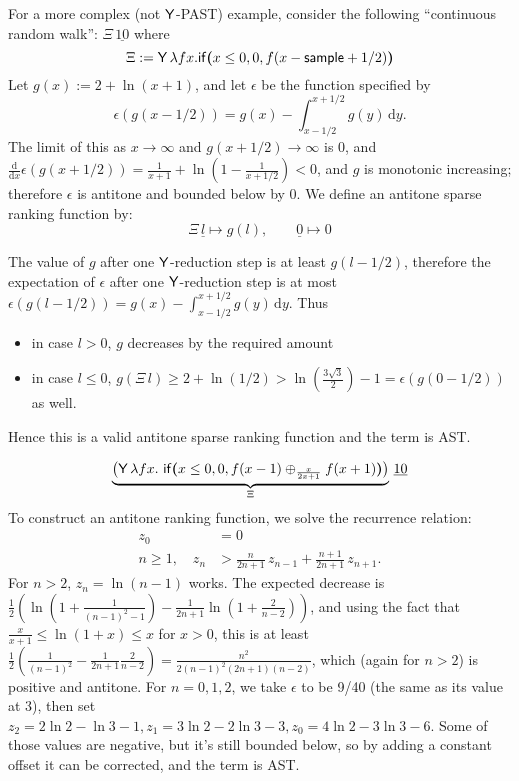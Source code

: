 For a more complex (not $\mathsf{Y}$-PAST) example, consider the following ``continuous random walk'': $\Xi \, \underline{10}$ where
\[
\Xi := \mathsf{Y} \, \lambda f x . \mathsf{if}\boldsymbol{(}x \leq 0, 0, f(x - \mathsf{sample} + 1/2)\boldsymbol{)} 
\]
Let $g(x) := 2 + \ln(x + 1)$, and let $\epsilon$ be the function specified by
\[
\epsilon(g(x-1/2)) = g(x) - \int_{x-1/2}^{x+1/2}g(y) \, \mathrm d y.
\]
The limit of this as $x \to \infty$ and $g(x+1/2) \to \infty$ is 0, and $\frac {\mathrm d}{\mathrm dx} \epsilon(g(x+1/2)) = \frac 1 {x+1} + \ln(1 - \frac 1 {x + 1/2}) < 0$, and $g$ is monotonic increasing; 
therefore $\epsilon$ is antitone and bounded below by 0.
We define an antitone sparse ranking function by:
\[
\Xi \, \underline l 
\mapsto 
g(l), \qquad 
\underline 0 \mapsto 0
\]

The value of $g$ after one $\mathsf{Y}$-reduction step is at least $g(l-1/2)$, therefore the expectation of $\epsilon$ after one $\mathsf{Y}$-reduction step is at most $\epsilon(g(l-1/2)) = g(x) - \int_{x-1/2}^{x+1/2}g(y) \, \mathrm d y$. 
Thus 
\begin{itemize}
\item in case $l > 0$, $g$ decreases by the required amount
\item in case $l \leq 0$, 
\(
g(\Xi \, l) \geq 2 + \ln(1/2) > \ln(\frac{3 \sqrt 3} 2) - 1 = \epsilon(g(0-1/2))
\) 
as well.
\end{itemize}
Hence this is a valid antitone sparse ranking function and the term is AST.


\[
\underbrace{\big
(\tY \, \lambda f x .\ 
\tif{x \leq 0}{0}{f(x - 1) \oplus_{\frac{x}{2x+1}} f(x + 1)} \big)}_{\Xi} 
\, \underline{10}
\]
To construct an antitone ranking function, we solve the recurrence relation:
\begin{align*}
z_0 &= 0\\
n \geq 1, \quad z_n &> \textstyle \frac{n}{2n + 1} \, z_{n-1} + \frac{n+1}{2n + 1} \, z_{n+1}.
\end{align*}
For $n > 2$, $z_n = \ln(n-1)$ works. The expected decrease is $\frac 1 2(\ln(1+\frac 1 {(n-1)^2-1}) - \frac 1 {2n+1} \ln(1 + \frac 2 {n-2}))$, and using the fact that $\frac x {x+1} \leq \ln (1+x) \leq x$ for $x > 0$, this is at least $\frac 1 2(\frac 1 {(n-1)^2} - \frac 1 {2n + 1} \frac 2 {n-2}) = \frac {n^2}{2(n-1)^2(2n+1)(n-2)}$, which (again for $n > 2$) is positive and antitone. For $n = 0, 1, 2$, we take $\epsilon$ to be 9/40 (the same as its value at 3), then set $z_2 = 2 \ln 2 - \ln 3 - 1, z_1 = 3 \ln 2 - 2 \ln 3 - 3, z_0 = 4 \ln 2 - 3 \ln 3 - 6$. Some of those values are negative, but it's still bounded below, so by adding a constant offset it can be corrected, and the term is AST.



